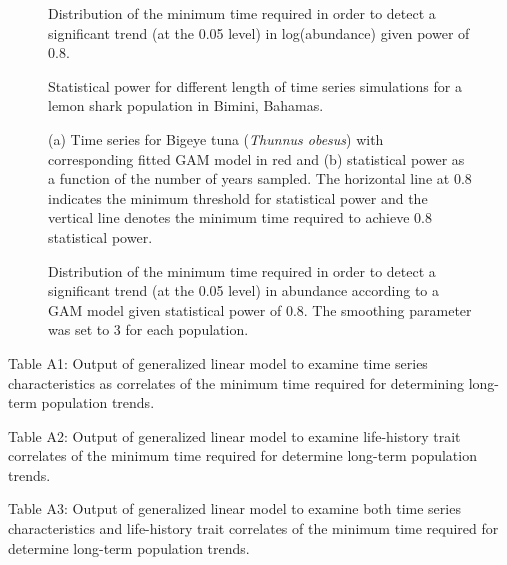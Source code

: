 \documentclass[12pt,]{article}
\begin{document}
\begin{figure}[htbp]
\centering
\caption{Distribution of the minimum time required in order to detect a
significant trend (at the 0.05 level) in log(abundance) given power of
0.8.\label{fig:min_time_dist_log_pop}}
\end{figure}

\begin{figure}[htbp]
\centering
\caption{Statistical power for different length of time series
simulations for a lemon shark population in Bimini,
Bahamas.\label{fig:shark_example}}
\end{figure}

\begin{figure}[htbp]
\centering
\caption{(a) Time series for Bigeye tuna (\emph{Thunnus obesus}) with
corresponding fitted GAM model in red and (b) statistical power as a
function of the number of years sampled. The horizontal line at 0.8
indicates the minimum threshold for statistical power and the vertical
line denotes the minimum time required to achieve 0.8 statistical
power.\label{fig:gam_example}}
\end{figure}

\begin{figure}[htbp]
\centering
\caption{Distribution of the minimum time required in order to detect a
significant trend (at the 0.05 level) in abundance according to a GAM
model given statistical power of 0.8. The smoothing parameter was set to
3 for each population.\label{fig:min_time_dist_gam}}
\end{figure}

\vspace{1 cm}

Table A1: Output of generalized linear model to examine time series
characteristics as correlates of the minimum time required for
determining long-term population trends.

\vspace{1 cm}

Table A2: Output of generalized linear model to examine life-history
trait correlates of the minimum time required for determine long-term
population trends.

\vspace{1 cm}

Table A3: Output of generalized linear model to examine both time series
characteristics and life-history trait correlates of the minimum time
required for determine long-term population trends.
\end{document}
